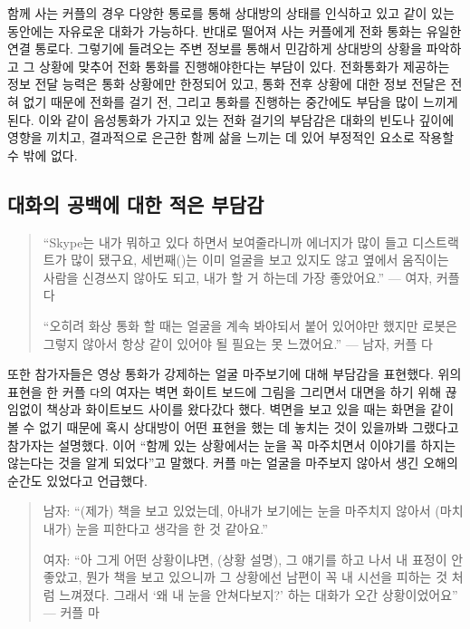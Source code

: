 함께 사는 커플의 경우 다양한 통로를 통해 상대방의 상태를 인식하고 있고 같이 있는 동안에는 자유로운 대화가 가능하다. 반대로 떨어져 사는 커플에게 전화 통화는 유일한 연결 통로다. 그렇기에 들려오는 주변 정보를 통해서 민감하게 상대방의 상황을 파악하고 그 상황에 맞추어 전화 통화를 진행해야한다는 부담이 있다.  전화 통화가 제공하는 정보 전달 능력은 통화 상황에만 한정되어 있고, 통화 전후 상황에 대한 정보 전달은 전혀 없기 때문에 전화를 걸기 전, 그리고 통화를 진행하는 중간에도 부담을 많이 느끼게 된다. 이와 같이 음성 통화가 가지고 있는 전화 걸기의 부담감은 대화의 빈도나 깊이에 영향을 끼치고, 결과적으로 은근한 함께 삶을 느끼는 데 있어 부정적인 요소로 작용할 수 밖에 없다.


\subsection{대화의 공백에 대한 적은 부담감}

\begin{quote}
``Skype는 내가 뭐하고 있다 하면서 보여줄라니까 에너지가 많이 들고 디스트랙트가 많이 됐구요, 세번째(\sysname)는 이미 얼굴을 보고 있지도 않고 옆에서 움직이는 사람을 신경쓰지 않아도 되고, 내가 할 거 하는데 가장 좋았어요.'' --- 여자, 커플 다

``오히려 화상 통화 할 때는 얼굴을 계속 봐야되서 붙어 있어야만 했지만 로봇은 그렇지 않아서 항상 같이 있어야 될 필요는 못 느꼈어요.'' --- 남자, 커플 다
\end{quote}

또한 참가자들은 영상 통화가 강제하는 얼굴 마주보기에 대해 부담감을 표현했다. 위의 표현을 한 커플 \texttt{다}의 여자는 벽면 화이트 보드에 그림을 그리면서 대면을 하기 위해 끊임없이 책상과 화이트보드 사이를 왔다갔다 했다. 벽면을 보고 있을 때는 화면을 같이 볼 수 없기 때문에 혹시 상대방이 어떤 표현을 했는 데 놓치는 것이 있을까봐 그랬다고 참가자는 설명했다. 이어 ``함께 있는 상황에서는 눈을 꼭 마주치면서 이야기를 하지는 않는다는 것을 알게 되었다''고 말했다. 커플 \texttt{마}는 얼굴을 마주보지 않아서 생긴 오해의 순간도 있었다고 언급했다.

\begin{quote}
남자: ``(제가) 책을 보고 있었는데, 아내가 보기에는 눈을 마주치지 않아서 (마치 내가) 눈을 피한다고 생각을 한 것 같아요.''

여자: ``아 그게 어떤 상황이냐면, (상황 설명), 그 얘기를 하고 나서 내 표정이 안좋았고, 뭔가 책을 보고 있으니까 그 상황에선 남편이 꼭 내 시선을 피하는 것 처럼 느껴졌다. 그래서 ‘왜 내 눈을 안쳐다보지?’ 하는 대화가 오간 상황이었어요'' --- 커플 마
\end{quote}

